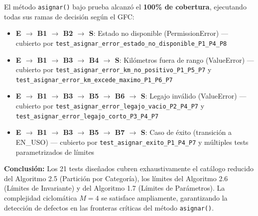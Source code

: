 El método \texttt{asignar()} bajo prueba alcanzó el \textbf{100\% de cobertura}, ejecutando todas sus ramas de decisión según el GFC:

\begin{itemize}
    \item \textbf{E $\rightarrow$ B1 $\rightarrow$ B2 $\rightarrow$ S}: Estado no disponible (PermissionError) — cubierto por \texttt{test\_asignar\_error\_estado\_no\_disponible\_P1\_P4\_P8}
    
    \item \textbf{E $\rightarrow$ B1 $\rightarrow$ B3 $\rightarrow$ B4 $\rightarrow$ S}: Kilómetros fuera de rango (ValueError) — cubierto por \texttt{test\_asignar\_error\_km\_no\_positivo\_P1\_P5\_P7} y \texttt{test\_asignar\_error\_km\_excede\_maximo\_P1\_P6\_P7}
    
    \item \textbf{E $\rightarrow$ B1 $\rightarrow$ B3 $\rightarrow$ B5 $\rightarrow$ B6 $\rightarrow$ S}: Legajo inválido (ValueError) — cubierto por \texttt{test\_asignar\_error\_legajo\_vacio\_P2\_P4\_P7} y \texttt{test\_asignar\_error\_legajo\_corto\_P3\_P4\_P7}
    
    \item \textbf{E $\rightarrow$ B1 $\rightarrow$ B3 $\rightarrow$ B5 $\rightarrow$ B7 $\rightarrow$ S}: Caso de éxito (transición a EN\_USO) — cubierto por \texttt{test\_asignar\_exito\_P1\_P4\_P7} y múltiples tests parametrizados de límites
\end{itemize}

\textbf{Conclusión:} Los 21 tests diseñados cubren exhaustivamente el catálogo reducido del Algoritmo 2.5 (Partición por Categoría), los límites del Algoritmo 2.6 (Límites de Invariante) y del Algoritmo 1.7 (Límites de Parámetros). La complejidad ciclomática $M=4$ se satisface ampliamente, garantizando la detección de defectos en las fronteras críticas del método \texttt{asignar()}.

